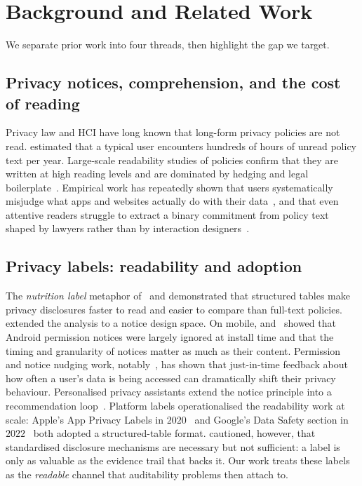 \documentclass[11pt,a4paper]{article}
\begin{document}
\section{Background and Related Work}
\label{sec:related-work}
We separate prior work into four threads, then highlight the gap we
target.

\subsection{Privacy notices, comprehension, and the cost of reading}
Privacy law and HCI have long known that long-form privacy policies are not
read. \citet{mcdonald2008cost} estimated that a typical user encounters
hundreds of hours of unread policy text per year. Large-scale readability
studies of policies confirm that they are written at high reading levels and
are dominated by hedging and legal
boilerplate~\citep{fabian2017large,jensen2004privacy}. Empirical work has
repeatedly shown that users systematically misjudge what apps and websites
actually do with their data~\citep{rao2016expecting,acquisti2015privacy},
and that even attentive readers struggle to extract a binary commitment
from policy text shaped by lawyers rather than by interaction
designers~\citep{bhatia2016theory}.

\subsection{Privacy labels: readability and adoption}
The \emph{nutrition label} metaphor of~\citet{kelley2009nutrition} and
\citet{kelley2010standardizing} demonstrated that structured tables make
privacy disclosures faster to read and easier to compare than full-text
policies. \citet{schaub2015design} extended the analysis to a notice
design space. On mobile, \citet{felt2012android}
and~\citet{egelman2013choice} showed that Android permission notices were
largely ignored at install time and that the timing and granularity of
notices matter as much as their content. Permission and notice nudging
work, notably~\citet{almuhimedi2015your}, has shown that just-in-time
feedback about how often a user's data is being accessed can dramatically
shift their privacy behaviour. Personalised privacy assistants extend the
notice principle into a recommendation
loop~\citep{lin2014modeling,liu2016follow}. Platform labels operationalised
the readability work at scale: Apple's App Privacy Labels in
$2020$~\citep{appleprivacylabels2020} and Google's Data Safety section in
$2022$~\citep{googledatasafety2022} both adopted a structured-table format.
\citet{cranor2012necessary} cautioned, however, that standardised
disclosure mechanisms are necessary but not sufficient: a label is only as
valuable as the evidence trail that backs it. Our work treats these labels
as the \emph{readable} channel that auditability problems then attach to.
\end{document}
